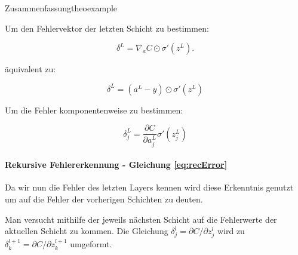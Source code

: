  
\begin{mytheo}{Zusammenfassung}{theoexample}


Um den Fehlervektor der letzten Schicht zu bestimmen: 

\begin{equation}
\delta^L = \nabla_a C \odot \sigma'(z^L).
\end{equation}


äquivalent zu: 

\begin{equation}
\delta^L = (a^L-y) \odot \sigma'(z^L)
\end{equation}


Um die Fehler komponentenweise zu bestimmen: 

\begin{equation}
\delta^L_j = \frac{\partial C}{\partial a^L_j} \sigma'(z^L_j)
\end{equation}

\end{mytheo}






\paragraph{Rekursive Fehlererkennung - Gleichung \ref{eq:recError}}

Da wir nun die Fehler des letzten Layers kennen wird diese Erkenntnis genutzt um auf die Fehler der vorherigen Schichten zu deuten. 

Man versucht mithilfe der jeweils nächsten Schicht auf die Fehlerwerte der aktuellen Schicht zu kommen. Die Gleichung $\delta^l_j = \partial C / \partial z^l_j$ wird zu $\delta^{l+1}_k = \partial C / \partial z^{l+1}_k$ umgeformt. 


